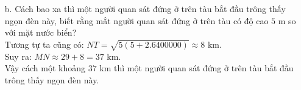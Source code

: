 \begin{ex}
{\begin{enumerate}
{$\Delta MTA \backsim \Delta MBT$ (g-g).\\
Suy ra: $MT^2=MA.MB\\
\Rightarrow MT=\sqrt{MA.MB}=\sqrt{65.(65+2.6400000)}\approx 29$ km.\\
Vậy một người quan sát đứng tại vị trí đèn của Hải đăng nhìn xa tối đa khoảng $29$ km.
}{
}
\item[b.] Cách bao xa thì một người quan sát đứng ở trên tàu bắt đầu trông thấy ngọn đèn này, biết rằng mắt người quan sát đứng ở trên tàu có độ cao $5$ m so với mặt nước biển?\\
Tương tự ta cũng có: $NT=\sqrt{5(5+2.6400000)}\approx 8$ km.\\
Suy ra: $MN\approx 29+8=37$ km.\\
Vậy cách một khoảng $37$ km thì một người quan sát đứng ở trên tàu bắt đầu trông thấy ngọn đèn này.
\end{enumerate}
}
\end{ex}

